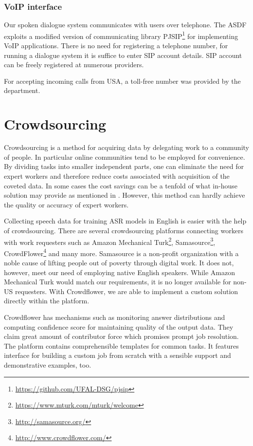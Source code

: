 \subsubsection{VoIP interface}

Our spoken dialogue system communicates with users over telephone.
The ASDF exploits a modified version of communicating library PJSIP\footnote{\url{https://github.com/UFAL-DSG/pjsip}} for implementing VoIP applications.
There is no need for registering a telephone number, for running a dialogue system it is suffice to enter SIP account details.
SIP account can be freely registered at numerous providers.

For accepting incoming calls from USA, a toll-free number was provided by the department.

\section{Crowdsourcing}

Crowdsourcing is a method for acquiring data by delegating work to a community of people.
In particular online communities tend to be employed for convenience.
By dividing tasks into smaller independent parts, one can eliminate the need for expert workers and therefore reduce costs associated with acquisition of the coveted data.
In some cases the cost savings can be a tenfold of what in-house solution may provide as mentioned in \cite{mturk}. %
However, this method can hardly achieve the quality or accuracy of expert workers.

Collecting speech data for training ASR models in English is easier with the help of crowdsourcing.
There are several crowdsourcing platforms connecting workers with work requesters such as
Amazon Mechanical Turk\footnote{\url{https://www.mturk.com/mturk/welcome}},
Samasource\footnote{\url{http://samasource.org/}},
CrowdFlower\footnote{\url{http://www.crowdflower.com/}}
and many more.
Samasource is a non-profit organization with a noble cause of lifting people out of poverty through digital work.
It does not, however, meet our need of employing native English speakers.
While Amazon Mechanical Turk would match our requirements, it is no longer available for non-US requesters.
With Crowdflower, we are able to implement a custom solution directly within the platform.

Crowdflower has mechanisms such as monitoring answer distributions and computing confidence score for maintaining quality of the output data. %
They claim great amount of contributor force which promises prompt job resolution. %
The platform contains comprehensible templates for common tasks.
It features interface for building a custom job from scratch with a sensible support and demonstrative examples, too. %

